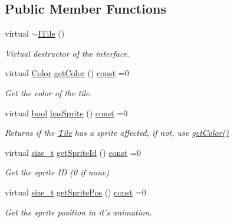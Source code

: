 \subsection*{Public Member Functions}
\begin{DoxyCompactItemize}
\item 
virtual \hyperlink{classarcade_1_1_i_tile_a45fb2120945fbddafb4b963d969a5b80}{$\sim$\-I\-Tile} ()
\begin{DoxyCompactList}\small\item\em Virtual destructor of the interface. \end{DoxyCompactList}\item 
virtual \hyperlink{unionarcade_1_1_color}{Color} \hyperlink{classarcade_1_1_i_tile_adb20cb553bc2ce17dc23125eb70b8329}{get\-Color} () \hyperlink{term__entry_8h_a57bd63ce7f9a353488880e3de6692d5a}{const} =0
\begin{DoxyCompactList}\small\item\em Get the color of the tile. \end{DoxyCompactList}\item 
virtual \hyperlink{term__entry_8h_a002004ba5d663f149f6c38064926abac}{bool} \hyperlink{classarcade_1_1_i_tile_ab2d6a5f8d4cfc6c606b8ad13d8dd88a4}{has\-Sprite} () \hyperlink{term__entry_8h_a57bd63ce7f9a353488880e3de6692d5a}{const} =0
\begin{DoxyCompactList}\small\item\em Returns if the \hyperlink{classarcade_1_1_tile}{Tile} has a sprite affected, if not, use \hyperlink{classarcade_1_1_i_tile_adb20cb553bc2ce17dc23125eb70b8329}{get\-Color()} \end{DoxyCompactList}\item 
virtual \hyperlink{nc__alloc_8h_a7b60c5629e55e8ec87a4547dd4abced4}{size\-\_\-t} \hyperlink{classarcade_1_1_i_tile_a4c09e2ac12d75fe12e3d4d1ca4e08150}{get\-Sprite\-Id} () \hyperlink{term__entry_8h_a57bd63ce7f9a353488880e3de6692d5a}{const} =0
\begin{DoxyCompactList}\small\item\em Get the sprite I\-D (0 if none) \end{DoxyCompactList}\item 
virtual \hyperlink{nc__alloc_8h_a7b60c5629e55e8ec87a4547dd4abced4}{size\-\_\-t} \hyperlink{classarcade_1_1_i_tile_a3e5cec4407ef6afb7e10d82fb1c93f5e}{get\-Sprite\-Pos} () \hyperlink{term__entry_8h_a57bd63ce7f9a353488880e3de6692d5a}{const} =0
\begin{DoxyCompactList}\small\item\em Get the sprite position in it's animation. \end{DoxyCompactList}\item 

\end{DoxyCompactItemize}
